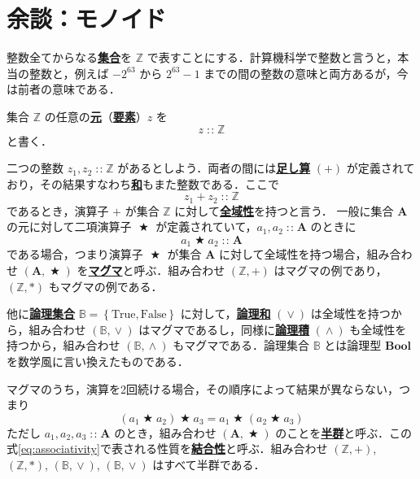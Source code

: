 \documentclass[a4paper,twocolumn]{jsbook}
\newcommand{\keyword}[1]{{\underline{\textbf{#1}}}}
\newcommand{\mSpecialConstant}[1]{\textrm{#1}} %
\newcommand{\mFalse}{\mSpecialConstant{False}}
\newcommand{\mTrue}{\mSpecialConstant{True}}
\DeclareMathOperator{\mBinOp}{\bigstar}
\DeclareMathOperator{\mIn}{{:\!:}}
\DeclareMathOperator{\mLogicalAnd}{\wedge}
\DeclareMathOperator{\mLogicalOr}{\vee}
\newcommand{\mSet}[1]{\mathbf{#1}}
\newcommand{\mSpecialSet}[1]{\mathbb{#1}} %
\newcommand{\mBSet}{\mSpecialSet{B}}
\newcommand{\mZSet}{\mSpecialSet{Z}}
\newcommand{\mType}[1]{\mathbf{#1}}
\newcommand{\mBoolType}{\mType{Bool}}
\newcommand{\mSetWith}[1]{\left\{#1\right\}}
\newcommand{\mTupleWith}[1]{\left(#1\right)}
\begin{document}
\section{余談：モノイド}

整数全てからなる\keyword{集合}を $\mZSet$ で表すことにする．計算機科学で整数と言うと，本当の整数と，例えば $-2^{63}$ から $2^{63}-1$ までの間の整数の意味と両方あるが，今は前者の意味である．

集合 $\mZSet$ の任意の\keyword{元}（\keyword{要素}）$z$ を
\begin{equation}
\label{eq:totality}
z\mIn\mZSet
\end{equation}
と書く．

二つの整数 $z_1,z_2\mIn\mZSet$ があるとしよう．両者の間には\keyword{足し算} $(+)$ が定義されており，その結果すなわち\keyword{和}もまた整数である．ここで
\begin{equation}
z_1+z_2\mIn\mZSet
\end{equation}
であるとき，演算子 $+$ が集合 $\mZSet$ に対して\keyword{全域性}を持つと言う．
一般に集合 $\mSet{A}$ の元に対して二項演算子 $\mBinOp$ が定義されていて，$a_1,a_2\mIn\mSet{A}$ のときに
\begin{equation}
\label{eq:totality}
a_1\mBinOp a_2\mIn\mSet{A}
\end{equation}
である場合，つまり演算子 $\mBinOp$ が集合 $\mSet{A}$ に対して全域性を持つ場合，組み合わせ $\mTupleWith{\mSet{A},\mBinOp}$ を\keyword{マグマ}と呼ぶ．組み合わせ $\mTupleWith{\mZSet,+}$ はマグマの例であり，$\mTupleWith{\mZSet,*}$ もマグマの例である．

他に\keyword{論理集合} $\mBSet=\mSetWith{\mTrue,\mFalse}$ に対して，\keyword{論理和} $(\mLogicalOr)$ は全域性を持つから，組み合わせ $\mTupleWith{\mBSet,\mLogicalOr}$ はマグマであるし，同様に\keyword{論理積} $(\mLogicalAnd)$ も全域性を持つから，組み合わせ $\mTupleWith{\mBSet,\mLogicalAnd}$ もマグマである．論理集合 $\mBSet$ とは論理型 $\mBoolType$ を数学風に言い換えたものである．

マグマのうち，演算を2回続ける場合，その順序によって結果が異ならない，つまり
\begin{equation}
\label{eq:associativity}
\left(a_1\mBinOp a_2\right)\mBinOp a_3
=a_1\mBinOp\left(a_2\mBinOp{a_3}\right)
\end{equation}
ただし $a_1,a_2,a_3\mIn\mSet{A}$ のとき，組み合わせ $\mTupleWith{\mSet{A},\mBinOp}$ のことを\keyword{半群}と呼ぶ．この式\eqref{eq:associativity}で表される性質を\keyword{結合性}と呼ぶ．組み合わせ $\mTupleWith{\mZSet,+}$, $\mTupleWith{\mZSet,*}$, $\mTupleWith{\mBSet,\mLogicalOr}$, $\mTupleWith{\mBSet,\mLogicalOr}$ はすべて半群である．
\end{document}
